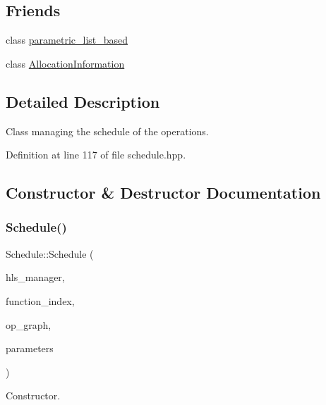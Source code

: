 \subsection*{Friends}
\begin{DoxyCompactItemize}
\item 
class \hyperlink{classSchedule_a44083050f827fe080f60a4b79b97bc93}{parametric\+\_\+list\+\_\+based}
\item 
class \hyperlink{classSchedule_a995b99fd9889f07eef755c6b9fe70c3f}{Allocation\+Information}
\end{DoxyCompactItemize}


\subsection{Detailed Description}
Class managing the schedule of the operations. 

Definition at line 117 of file schedule.\+hpp.



\subsection{Constructor \& Destructor Documentation}
\mbox{\label{classSchedule_a245be13feb696aef57541ec19dcb5c5a}} 
\subsubsection{\texorpdfstring{Schedule()}{Schedule()}}
{\footnotesize\ttfamily Schedule\+::\+Schedule (\begin{DoxyParamCaption}\item[{const \hyperlink{hls__manager_8hpp_a1b481383e3beabc89bd7562ae672dd8c}{H\+L\+S\+\_\+manager\+Const\+Ref}}]{hls\+\_\+manager,  }\item[{const unsigned int}]{function\+\_\+index,  }\item[{const \hyperlink{op__graph_8hpp_a9a0b240622c47584bee6951a6f5de746}{Op\+Graph\+Const\+Ref}}]{op\+\_\+graph,  }\item[{const \hyperlink{Parameter_8hpp_a37841774a6fcb479b597fdf8955eb4ea}{Parameter\+Const\+Ref}}]{parameters }\end{DoxyParamCaption})}



Constructor. 



